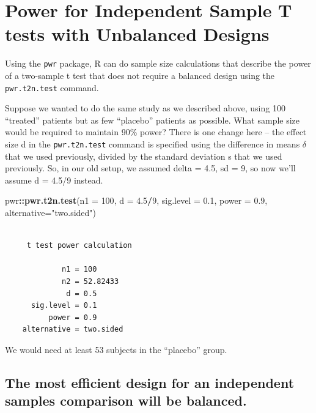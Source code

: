\documentclass[
]{book}
\newenvironment{Shaded}{\begin{snugshade}}{\end{snugshade}}
\newcommand{\DataTypeTok}[1]{\textcolor[rgb]{0.13,0.29,0.53}{#1}}
\newcommand{\DecValTok}[1]{\textcolor[rgb]{0.00,0.00,0.81}{#1}}
\newcommand{\FloatTok}[1]{\textcolor[rgb]{0.00,0.00,0.81}{#1}}
\newcommand{\KeywordTok}[1]{\textcolor[rgb]{0.13,0.29,0.53}{\textbf{#1}}}
\newcommand{\NormalTok}[1]{#1}
\newcommand{\OperatorTok}[1]{\textcolor[rgb]{0.81,0.36,0.00}{\textbf{#1}}}
\newcommand{\StringTok}[1]{\textcolor[rgb]{0.31,0.60,0.02}{#1}}
\begin{document}
\hypertarget{power-for-independent-sample-t-tests-with-unbalanced-designs}{%
\section{Power for Independent Sample T tests with Unbalanced Designs}\label{power-for-independent-sample-t-tests-with-unbalanced-designs}}

Using the \texttt{pwr} package, R can do sample size calculations that describe the power of a two-sample t test that does not require a balanced design using the \texttt{pwr.t2n.test} command.

Suppose we wanted to do the same study as we described above, using 100 ``treated'' patients but as few ``placebo'' patients as possible. What sample size would be required to maintain 90\% power? There is one change here -- the effect size d in the \texttt{pwr.t2n.test} command is specified using the difference in means \(\delta\) that we used previously, divided by the standard deviation s that we used previously. So, in our old setup, we assumed delta = 4.5, sd = 9, so now we'll assume d = 4.5/9 instead.

\begin{Shaded}
\begin{Highlighting}[]
\NormalTok{pwr}\OperatorTok{::}\KeywordTok{pwr.t2n.test}\NormalTok{(}\DataTypeTok{n1 =} \DecValTok{100}\NormalTok{, }\DataTypeTok{d =} \FloatTok{4.5}\OperatorTok{/}\DecValTok{9}\NormalTok{, }
             \DataTypeTok{sig.level =} \FloatTok{0.1}\NormalTok{, }\DataTypeTok{power =} \FloatTok{0.9}\NormalTok{,}
             \DataTypeTok{alternative=}\StringTok{"two.sided"}\NormalTok{)}
\end{Highlighting}
\end{Shaded}

\begin{verbatim}

     t test power calculation 

             n1 = 100
             n2 = 52.82433
              d = 0.5
      sig.level = 0.1
          power = 0.9
    alternative = two.sided
\end{verbatim}

We would need at least 53 subjects in the ``placebo'' group.

\hypertarget{the-most-efficient-design-for-an-independent-samples-comparison-will-be-balanced.}{%
\subsection{The most efficient design for an independent samples comparison will be balanced.}\label{the-most-efficient-design-for-an-independent-samples-comparison-will-be-balanced.}}
\end{document}
